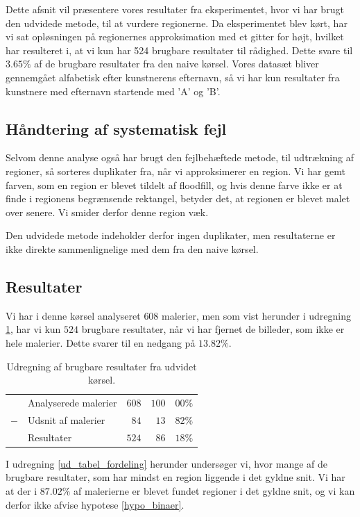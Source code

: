 {
{\sffamily Dette afsnit vil præsentere vores resultater fra
eksperimentet, hvor vi har brugt den udvidede metode, til at vurdere
regionerne. Da eksperimentet blev kørt, har vi sat opløsningen på
regionernes approksimation med et gitter for højt, hvilket har
resulteret i, at vi kun har 524 brugbare resultater til rådighed. Dette
svare til $\mathsf{3.65\%}$ af de brugbare resultater fra den naive
kørsel. Vores datasæt bliver gennemgået alfabetisk efter kunstnerens
efternavn, så vi har kun resultater fra kunstnere med efternavn
startende med 'A' og 'B'.
}

\subsection{Håndtering af systematisk fejl}
Selvom denne analyse også har brugt den fejlbehæftede metode, til
udtrækning af regioner, så sorteres duplikater fra, når vi approksimerer
en region. Vi har gemt farven, som en region er blevet tildelt af
floodfill, og hvis denne farve ikke er at finde i regionens begrænsende
rektangel, betyder det, at regionen er blevet malet over senere. Vi
smider derfor denne region væk.

Den udvidede metode indeholder derfor ingen duplikater, men resultaterne
er ikke direkte sammenlignelige med dem fra den naive kørsel.

\subsection{Resultater}
Vi har i denne kørsel analyseret $608$ malerier, men som vist herunder i
udregning \ref{ud_tabel_fjern_detaljer}, har vi kun $524$ brugbare
resultater, når vi har fjernet de billeder, som ikke er hele malerier.
Dette svarer til en nedgang på $13.82\%$.

\begin{table}[H]
    \centering
    \begin{tabular}{r@{\ \ }p{12em}r|r@{.}l}
            & Analyserede malerier & $608$ & $100$ & $00\%$   \\
        $-$ & Udsnit af malerier   &  $84$ &  $13$ & $82\%$   \\\hline
            & Resultater           & $524$ &  $86$ & $18\%$
    \end{tabular}
    \caption[]{Udregning af brugbare resultater fra udvidet kørsel.}
    \label{ud_tabel_fjern_detaljer}
\end{table}

I udregning \ref{ud_tabel_fordeling} herunder undersøger vi, hvor mange
af de brugbare resultater, som har mindst en region liggende i det
gyldne snit. Vi har at der i $87.02\%$ af malerierne er blevet fundet
regioner i det gyldne snit, og vi kan derfor ikke afvise hypotese
\ref{hypo_binaer}.

}
